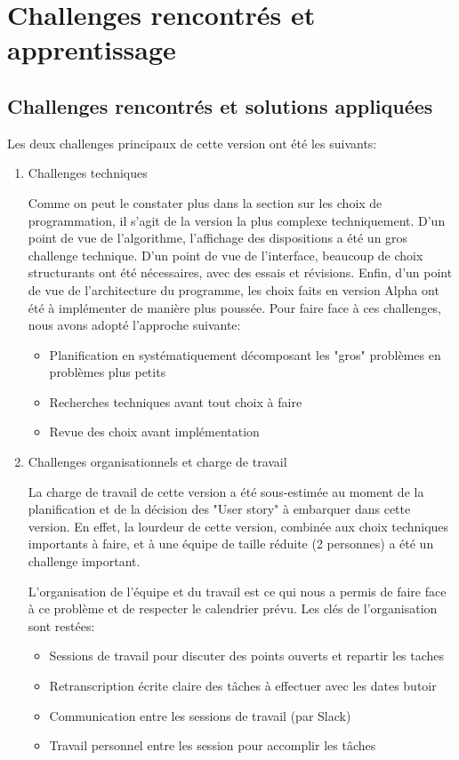 \section{Challenges rencontrés et apprentissage}

\subsection{Challenges rencontrés et solutions appliquées}

Les deux challenges principaux de cette version ont été les suivants:
\begin{enumerate}
    \item Challenges techniques
    
          Comme on peut le constater plus dans la section sur les choix de programmation, il s’agit de la version la plus complexe techniquement.
          D’un point de vue de l’algorithme, l’affichage des dispositions a été un gros challenge technique.
          D’un point de vue de l’interface, beaucoup de choix structurants ont été nécessaires, avec des essais et révisions.
          Enfin, d’un point de vue de l’architecture du programme, les choix faits en version Alpha ont été à implémenter de manière plus poussée.
          Pour faire face à ces challenges, nous avons adopté l’approche suivante:
          \begin{itemize}
              \item Planification en systématiquement décomposant les "gros" problèmes en problèmes plus petits
              \item Recherches techniques avant tout choix à faire
              \item Revue des choix avant implémentation
          \end{itemize}
    \item Challenges organisationnels et charge de travail
    
    La charge de travail de cette version a été sous-estimée au moment de la planification et de la décision des "User story" à embarquer 
    dans cette version. En effet, la lourdeur de cette version, combinée aux choix techniques importants à faire, et à une équipe 
    de taille réduite (2 personnes) a été un challenge important.
    
    L’organisation de l'équipe et du travail est ce qui nous a permis de faire face à ce problème et de respecter le calendrier prévu. 
    Les clés de l’organisation sont restées:
    \begin{itemize}
        \item Sessions de travail pour discuter des points ouverts et repartir les taches
        \item Retranscription écrite claire des tâches à effectuer avec les dates butoir
        \item Communication entre les sessions de travail (par Slack)
        \item Travail personnel entre les session pour accomplir les tâches
    \end{itemize}

\end{enumerate}


